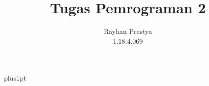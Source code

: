 \documentclass[12pt]{ociamthesis}  %
\title{ Tugas Pemrograman 2\\
}   %
\author{Rayhan Prastya \\
1.18.4.069}             %
\begin{document}
\baselineskip=18pt plus1pt

\setcounter{secnumdepth}{3}
\setcounter{tocdepth}{3}


\maketitle                  %

\begin{romanpages}          %
\tableofcontents            %
\end{romanpages}            %


 
%
%
%
%
%
%
%
%
\end{document}
